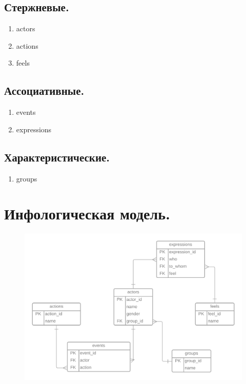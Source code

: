 \subsection{Стержневые.}
\begin{enumerate}
    \item actors
    \item actions
    \item feels
\end{enumerate}

\subsection{Ассоциативные.}

\begin{enumerate}
    \item events
    \item expressions
\end{enumerate}

\subsection{Характеристические.}

\begin{enumerate}
    \item groups
\end{enumerate}

\section{Инфологическая модель.}
\begin{figure}[H]
	\centering
	\includegraphics[scale=0.15]{img/info_model}
\end{figure}

